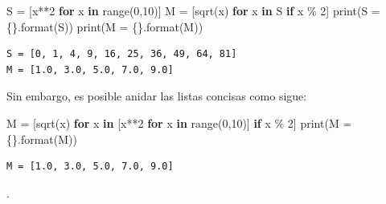 \documentclass[
  spanish,
  letterpaper,
]{scrbook}
\newenvironment{Shaded}{\begin{snugshade}}{\end{snugshade}}
\newcommand{\BuiltInTok}[1]{\textcolor[rgb]{0.00,0.23,0.31}{#1}}
\newcommand{\ControlFlowTok}[1]{\textcolor[rgb]{0.00,0.23,0.31}{\textbf{#1}}}
\newcommand{\DecValTok}[1]{\textcolor[rgb]{0.68,0.00,0.00}{#1}}
\newcommand{\KeywordTok}[1]{\textcolor[rgb]{0.00,0.23,0.31}{\textbf{#1}}}
\newcommand{\NormalTok}[1]{\textcolor[rgb]{0.00,0.23,0.31}{#1}}
\newcommand{\OperatorTok}[1]{\textcolor[rgb]{0.37,0.37,0.37}{#1}}
\newcommand{\SpecialCharTok}[1]{\textcolor[rgb]{0.37,0.37,0.37}{#1}}
\newcommand{\StringTok}[1]{\textcolor[rgb]{0.13,0.47,0.30}{#1}}
\theoremstyle{definition}
\theoremstyle{remark}
\begin{document}
\begin{Shaded}
\begin{Highlighting}[]
\NormalTok{S }\OperatorTok{=}\NormalTok{ [x}\OperatorTok{**}\DecValTok{2} \ControlFlowTok{for}\NormalTok{ x }\KeywordTok{in} \BuiltInTok{range}\NormalTok{(}\DecValTok{0}\NormalTok{,}\DecValTok{10}\NormalTok{)]}
\NormalTok{M }\OperatorTok{=}\NormalTok{ [sqrt(x) }\ControlFlowTok{for}\NormalTok{ x }\KeywordTok{in}\NormalTok{ S }\ControlFlowTok{if}\NormalTok{ x }\OperatorTok{\%} \DecValTok{2}\NormalTok{]}
\BuiltInTok{print}\NormalTok{(}\StringTok{\textquotesingle{}S = }\SpecialCharTok{\{\}}\StringTok{\textquotesingle{}}\NormalTok{.}\BuiltInTok{format}\NormalTok{(S))}
\BuiltInTok{print}\NormalTok{(}\StringTok{\textquotesingle{}M = }\SpecialCharTok{\{\}}\StringTok{\textquotesingle{}}\NormalTok{.}\BuiltInTok{format}\NormalTok{(M))}
\end{Highlighting}
\end{Shaded}

\begin{verbatim}
S = [0, 1, 4, 9, 16, 25, 36, 49, 64, 81]
M = [1.0, 3.0, 5.0, 7.0, 9.0]
\end{verbatim}

Sin embargo, es posible anidar las listas concisas como sigue:

\begin{Shaded}
\begin{Highlighting}[]
\NormalTok{M }\OperatorTok{=}\NormalTok{ [sqrt(x) }\ControlFlowTok{for}\NormalTok{ x }\KeywordTok{in}\NormalTok{ [x}\OperatorTok{**}\DecValTok{2} \ControlFlowTok{for}\NormalTok{ x }\KeywordTok{in} \BuiltInTok{range}\NormalTok{(}\DecValTok{0}\NormalTok{,}\DecValTok{10}\NormalTok{)] }\ControlFlowTok{if}\NormalTok{ x }\OperatorTok{\%} \DecValTok{2}\NormalTok{]}
\BuiltInTok{print}\NormalTok{(}\StringTok{\textquotesingle{}M = }\SpecialCharTok{\{\}}\StringTok{\textquotesingle{}}\NormalTok{.}\BuiltInTok{format}\NormalTok{(M))}
\end{Highlighting}
\end{Shaded}

\begin{verbatim}
M = [1.0, 3.0, 5.0, 7.0, 9.0]
\end{verbatim}

.
\end{document}
